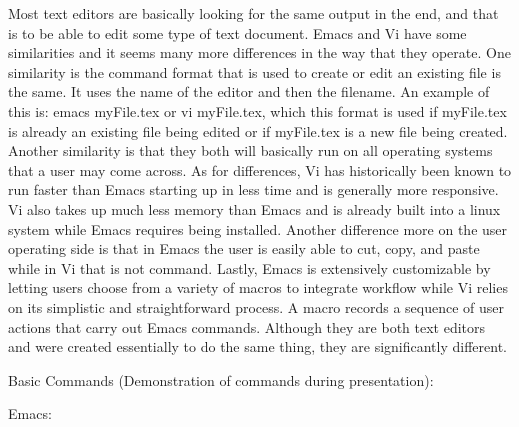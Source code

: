 \documentclass{article} %
\begin{document}
\noindent Most text editors are basically looking for the same output in the end, and that is to be able to edit some type of text document. Emacs and Vi have some similarities and it seems many more differences in the way that they operate. One similarity is the command format  that is used to create or edit an existing file is the same. It uses the name of the editor and then the filename. An example of this is: emacs myFile.tex or vi myFile.tex, which this format is used if myFile.tex is already an existing file being edited or if myFile.tex is a new file being created. Another similarity is that they both will basically run on all operating systems that a user may come across. As for differences, Vi has historically been known to run faster than Emacs starting up in less time and is generally more responsive. Vi also takes up much less memory than Emacs and is already built into a linux system while Emacs requires being installed. Another difference more on the user operating side is that in Emacs the user is easily able to cut, copy, and paste while in Vi that is not command. Lastly, Emacs is extensively customizable by letting users choose from a variety of macros to integrate workflow while Vi relies on its simplistic and straightforward process. A macro records a sequence of user actions that carry out Emacs commands. Although they are both text editors and were created essentially to do the same thing, they are significantly different.

\noindent 

\noindent Basic Commands (Demonstration of commands during presentation):

\noindent 

\noindent Emacs:

\noindent 
\end{document}
